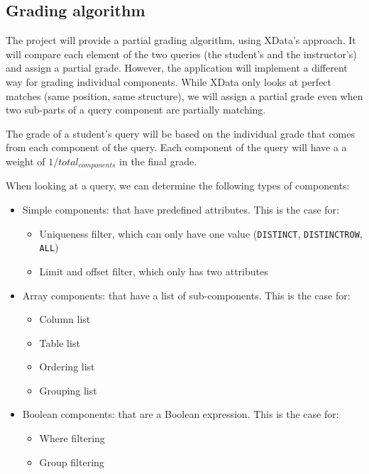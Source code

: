 \subsection{Grading algorithm} \label{ch:des:grading}

The project will provide a partial grading algorithm, using XData's approach. It will compare each element of the two queries (the student's and the instructor's) and assign a partial grade. However, the application will implement a different way for grading individual components. While XData only looks at perfect matches (same position, same structure), we will assign a partial grade even when two sub-parts of a query component are partially matching.

The grade of a student's query will be based on the individual grade that comes from each component of the query. Each component of the query will have a a weight of $1 / total_{components}$  in the final grade.

When looking at a query, we can determine the following types of components:

\begin{itemize}
    \item Simple components: that have predefined attributes. This is the case for:
        \begin{itemize}
            \item Uniqueness filter, which can only have one value (\texttt{DISTINCT}, \texttt{DISTINCTROW}, \texttt{ALL})
            \item Limit and offset filter, which only has two attributes
        \end{itemize}
    \item Array components: that have a list of sub-components. This is the case for:
        \begin{itemize}
            \item Column list
            \item Table list
            \item Ordering list
            \item Grouping list
        \end{itemize}
    \item Boolean components: that are a Boolean expression. This is the case for:
        \begin{itemize}
            \item Where filtering
            \item Group filtering
        \end{itemize}
\end{itemize}

